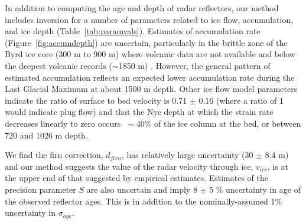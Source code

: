 In addition to computing the age and depth of radar reflectors, our method includes inversion for a number of parameters related to ice flow, accumulation, and ice depth (Table~\ref{tab:paramvals}). Estimates of accumulation rate (Figure~\ref{fig:accumdepth}) are uncertain, particularly in the brittle zone of the Byrd ice core (300 m to 900 m) where volcanic data are not available and below the deepest volcanic records ($\sim$1850 m) \citep{hammer1997}. However, the general pattern of estimated accumulation reflects an expected lower accumulation rate during the Last Glacial Maximum at about 1500 m depth. Other ice flow model parameters indicate the ratio of surface to bed velocity is 0.71 $\pm$ 0.16 (where a ratio of 1 would indicate plug flow) and that the Nye depth at which the strain rate decreases linearly to zero occurs $~\sim$40\% of the ice column at the bed, or between 720 and 1026 m depth. 

We find the firn correction, $d_{firn}$, has relatively large uncertainty (30 $\pm$ 8.4 m) and our method suggests the value of the radar velocity through ice, $v_{ice}$, is at the upper end of that suggested by empirical estimates. Estimates of the precision parameter $S$ are also uncertain and imply 8 $\pm$ 5 \% uncertainty in age of the observed reflector ages. This is in addition to the nominally-assumed 1\% uncertainty in $\sigma_{age}$.








